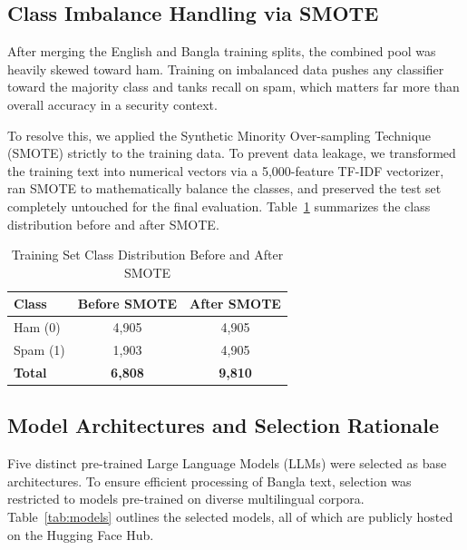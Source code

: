 \documentclass[journal]{IEEEtran}
\begin{document}
\subsection{Class Imbalance Handling via SMOTE}

After merging the English and Bangla training splits, the combined pool was heavily skewed toward ham. Training on imbalanced data pushes any classifier toward the majority class and tanks recall on spam, which matters far more than overall accuracy in a security context.

To resolve this, we applied the Synthetic Minority Over-sampling Technique (SMOTE) strictly to the training data. To prevent data leakage, we transformed the training text into numerical vectors via a 5,000-feature TF-IDF vectorizer, ran SMOTE to mathematically balance the classes, and preserved the test set completely untouched for the final evaluation. Table~\ref{tab:smote} summarizes the class distribution before and after SMOTE.

\begin{table}[htbp]
\caption{Training Set Class Distribution Before and After SMOTE}
\label{tab:smote}
\centering
\begin{tabular}{lcc}
\toprule
\textbf{Class} & \textbf{Before SMOTE} & \textbf{After SMOTE} \\
\midrule
Ham (0) & 4,905 & 4,905 \\
Spam (1) & 1,903 & 4,905 \\
\midrule
\textbf{Total} & \textbf{6,808} & \textbf{9,810} \\
\bottomrule
\end{tabular}
\end{table}

\subsection{Model Architectures and Selection Rationale}

Five distinct pre-trained Large Language Models (LLMs) were selected as base architectures. To ensure efficient processing of Bangla text, selection was restricted to models pre-trained on diverse multilingual corpora. Table~\ref{tab:models} outlines the selected models, all of which are publicly hosted on the Hugging Face Hub.
\end{document}
